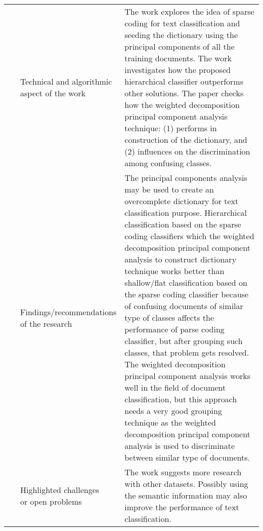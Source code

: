 \begin{landscape}
\begin{longtable}{lp{}p{}}
	\multirow{3}[0]{*}{~\citep{Sharma2017a}} & 
    \specialcell{Technical and algorithmic \\ aspect of the work} &
    The work explores the idea of sparse coding for text classification and seeding the dictionary using the principal components of all the training documents. The work investigates how the proposed hierarchical classifier outperforms other solutions. The paper checks how the weighted decomposition principal component analysis technique: (1) performs in construction of the dictionary, and (2) influences on the discrimination among confusing classes.     
    \\ & 
    \specialcell{Findings/recommendations \\ of the research} & 
	The principal components analysis may be used to create an overcomplete dictionary for text classification purpose. Hierarchical classification based on the sparse coding classifiers which the weighted decomposition principal component analysis to construct dictionary technique works better than shallow/flat classification based on the sparse coding classifier because of confusing documents of similar type of classes affects the performance of parse coding classifier, but after grouping such classes, that problem gets resolved. The weighted decomposition principal component analysis works well in the field of document classification, but this approach needs a very good grouping technique as the weighted decomposition principal component analysis is used to discriminate between similar type of documents.
    \\ & 
    \specialcell{Highlighted challenges \\ or open problems} & 
	The work suggests more research with other datasets. Possibly using the semantic information may also improve the performance of text classification.
	\\
	

\end{longtable}
\end{landscape}
